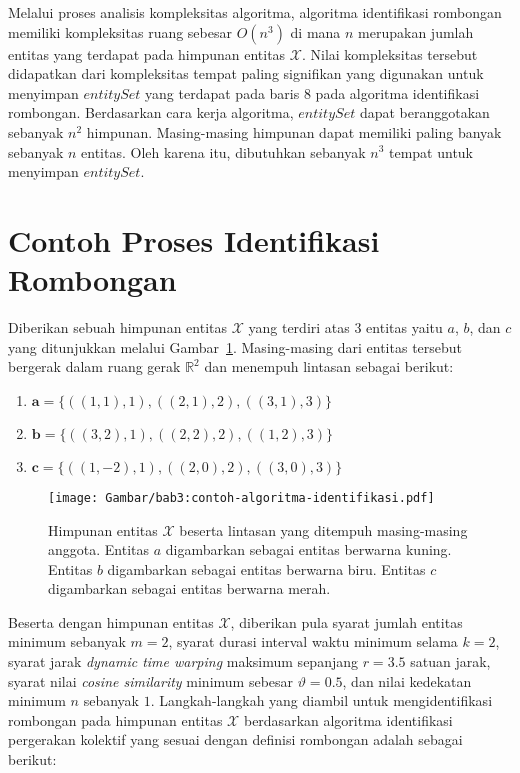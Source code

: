 Melalui proses analisis kompleksitas algoritma, algoritma identifikasi rombongan memiliki kompleksitas ruang sebesar $O(n^3)$ di mana $n$ merupakan jumlah entitas yang terdapat pada himpunan entitas $\mathcal{X}$. Nilai kompleksitas tersebut didapatkan dari kompleksitas tempat paling signifikan yang digunakan untuk menyimpan $entitySet$ yang terdapat pada baris $8$ pada algoritma identifikasi rombongan. Berdasarkan cara kerja algoritma, $entitySet$ dapat beranggotakan sebanyak $n^2$ himpunan. Masing-masing himpunan dapat memiliki paling banyak sebanyak $n$ entitas. Oleh karena itu, dibutuhkan sebanyak $n^3$ tempat untuk menyimpan $entitySet$.


\section{Contoh Proses Identifikasi Rombongan}
\label{sec:algorithm-example}

Diberikan sebuah himpunan entitas $\mathcal{X}$ yang terdiri atas 3 entitas yaitu $a$, $b$, dan $c$ yang ditunjukkan melalui Gambar~\ref{bab3:contoh-algoritma-identifikasi}. Masing-masing dari entitas tersebut bergerak dalam ruang gerak $\mathbb{R}^2$ dan menempuh lintasan sebagai berikut:

\begin{enumerate}
    \item $\textbf{a} = \{ ((1, 1), 1), ((2, 1), 2),  ((3, 1), 3) \}$
    \item $\textbf{b} = \{ ((3, 2), 1), ((2, 2), 2), ((1, 2), 3) \}$
    \item $\textbf{c} = \{ ((1, -2), 1), ((2, 0), 2), ((3, 0), 3) \}$
\end{enumerate}

\begin{figure}[t]
    \centering
    \captionsetup{width=0.7\textwidth}
    \texttt{[image: Gambar/bab3:contoh-algoritma-identifikasi.pdf]}
    \caption[Contoh proses algoritma identifikasi rombongan]{Himpunan entitas $\mathcal{X}$ beserta lintasan yang ditempuh masing-masing anggota. Entitas $a$ digambarkan sebagai entitas berwarna kuning. Entitas $b$ digambarkan sebagai entitas berwarna biru. Entitas $c$ digambarkan sebagai entitas berwarna merah.}
    \label{bab3:contoh-algoritma-identifikasi}
\end{figure}

Beserta dengan himpunan entitas $\mathcal{X}$, diberikan pula syarat jumlah entitas minimum sebanyak $m = 2$, syarat durasi interval waktu minimum selama $k = 2$, syarat jarak \textit{dynamic time warping} maksimum sepanjang $r = 3.5$ satuan jarak, syarat nilai \textit{cosine similarity} minimum sebesar $\vartheta = 0.5$, dan nilai kedekatan minimum $n$ sebanyak $1$. Langkah-langkah yang diambil untuk mengidentifikasi rombongan pada himpunan entitas $\mathcal{X}$ berdasarkan algoritma identifikasi pergerakan kolektif yang sesuai dengan definisi rombongan adalah sebagai berikut:

